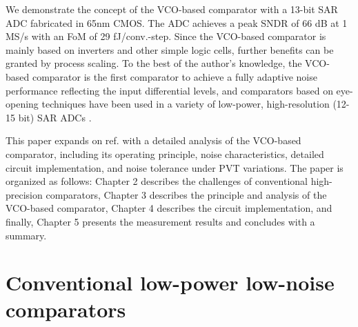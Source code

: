 \documentclass[journal]{IEEEtran}
\begin{document}
We demonstrate the concept of the VCO-based comparator with a 13-bit SAR ADC fabricated in 65nm CMOS. The ADC achieves a peak SNDR of 66 dB at 1 MS/s with an FoM of 29 fJ/conv.-step. Since the VCO-based comparator is mainly based on inverters and other simple logic cells, further benefits can be granted by process scaling.
To the best of the author's knowledge, the VCO-based comparator is the first comparator to achieve a fully adaptive noise performance reflecting the input differential levels, and comparators based on eye-opening techniques have been used in a variety of low-power, high-resolution (12-15 bit) SAR ADCs \cite{ding20190, luo2020input, hsieh20180, li2019design, li202065, almarashli2017nyquist, shim2017edge, zhu201914, pan202012, lee2019fast, vogelmann2020efficient}.

This paper expands on ref.\cite{yoshioka201413b} with a detailed analysis of the VCO-based comparator, including its operating principle, noise characteristics, detailed circuit implementation, and noise tolerance under PVT variations.
The paper is organized as follows: Chapter 2 describes the challenges of conventional high-precision comparators, Chapter 3 describes the principle and analysis of the VCO-based comparator, Chapter 4 describes the circuit implementation, and finally, Chapter 5 presents the measurement results and concludes with a summary.

\section{Conventional low-power low-noise comparators}
\end{document}

